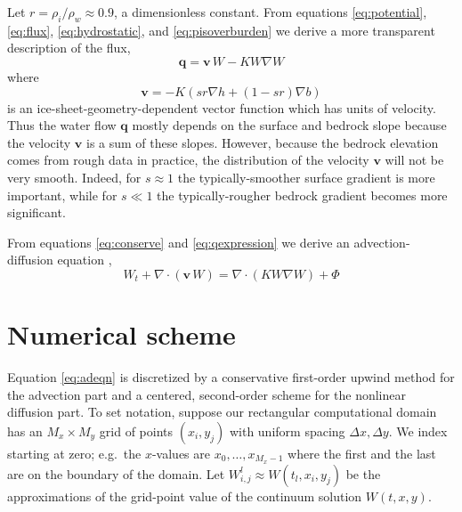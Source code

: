\documentclass[12pt,final]{amsart}%
\newcommand\bv{\mathbf{v}}
\newcommand\bq{\mathbf{q}}
\newcommand{\Div}{\nabla\cdot}
\newcommand{\grad}{\nabla}
\begin{document}
Let $r = \rho_i / \rho_w \approx 0.9$, a dimensionless constant.  From equations \eqref{eq:potential}, \eqref{eq:flux}, \eqref{eq:hydrostatic}, and \eqref{eq:pisoverburden} we derive a more transparent description of the flux,
\begin{equation} \label{eq:qexpression}
  \bq = \bv\, W - K W \grad W
\end{equation}
where
\begin{equation} \label{eq:vexpression}
  \bv = - K \left(s r \grad h + (1-sr) \grad b\right)
\end{equation}
is an ice-sheet-geometry-dependent vector function which has units of velocity.  Thus the water flow $\bq$ mostly depends on the surface and bedrock slope because the velocity $\bv$ is a sum of these slopes.  However, because the bedrock elevation comes from rough data in practice, the distribution of the velocity $\bv$ will not be very smooth.  Indeed, for $s\approx 1$ the typically-smoother surface gradient is more important, while for $s \ll 1$ the typically-rougher bedrock gradient becomes more significant.

From equations \eqref{eq:conserve} and \eqref{eq:qexpression} we derive an advection-diffusion equation \citep{HundsdorferVerwer2010,MortonMayers},
\begin{equation} \label{eq:adeqn}
  W_t + \Div\left(\bv\, W\right) = \Div \left(K W \grad W\right) + \Phi
\end{equation}


\section*{Numerical scheme}

\newcommand{\Wlij}{W^l_{i,j}}
\newcommand{\Wij}{W_{i,j}}
\newcommand{\upp}[3]{\big<#1\big|_{#3}\,#2\big>}

Equation \eqref{eq:adeqn} is discretized by a conservative first-order upwind method for the advection part and a centered, second-order scheme for the nonlinear diffusion part.  To set notation, suppose our rectangular computational domain has an $M_x \times M_y$ grid of points $(x_i,y_j)$ with uniform spacing $\Delta x,\Delta y$.  We index starting at zero; e.g.~the $x$-values are $x_0,\dots,x_{M_x-1}$ where the first and the last are on the boundary of the domain.  Let $\Wlij \approx W(t_l,x_i,y_j)$ be the approximations of the grid-point value of the continuum solution $W(t,x,y)$.
\end{document}
